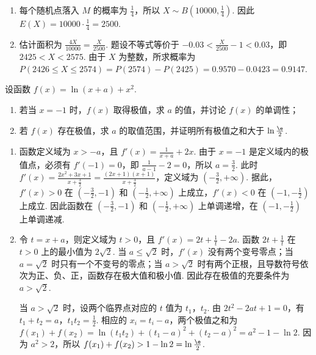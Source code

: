 \begin{solution}
\begin{enumerate}
\item 每个随机点落入 \(M\) 的概率为 \(\frac{1}{4}\)，所以 \(X\sim B\left(10000,\frac{1}{4}\right)\). 因此
\(E(X)=10000\cdot\frac{1}{4}=2500\).
\item 估计面积为 \(\frac{4X}{10000}=\frac{X}{2500}\). 题设不等式等价于
\(-0.03<\frac{X}{2500}-1<0.03\)，即 \(2425<X<2575\). 由于 \(X\) 为整数，所求概率为
\(P(2426\leqslant X\leqslant2574)=P(2574)-P(2425)=0.9570-0.0423=0.9147\).
\end{enumerate}
\end{solution}

\begin{problem}
设函数 \( f(x) = \ln (x + a) + x^2 \).

\begin{enumerate}
\item 若当 \(x = -1\) 时，\(f(x)\) 取得极值，求 \(a\) 的值，并讨论 \(f(x)\) 的单调性；
\item 若 \(f(x)\) 存在极值，求 \(a\) 的取值范围，并证明所有极值之和大于 \( \ln \frac{\e}{2} \).
\end{enumerate}
\end{problem}

\begin{solution}
\begin{enumerate}
\item 函数定义域为 \(x>-a\)，且 \(f'(x)=\frac{1}{x+a}+2x\). 由于 \(x=-1\) 是定义域内的极值点，必须有 \(f'(-1)=0\)，即 \(\frac{1}{a-1}-2=0\)，所以 \(a=\frac{3}{2}\). 此时
\(f'(x)=\frac{2x^2+3x+1}{x+\frac{3}{2}}=\frac{(2x+1)(x+1)}{x+\frac{3}{2}}\)，定义域为 \(\left(-\frac{3}{2},+\infty\right)\). 据此，\(f'(x)>0\) 在 \(\left(-\frac{3}{2},-1\right)\) 和 \(\left(-\frac{1}{2},+\infty\right)\) 上成立，\(f'(x)<0\) 在 \(\left(-1,-\frac{1}{2}\right)\) 上成立. 因此函数在 \(\left(-\frac{3}{2},-1\right)\) 和 \(\left(-\frac{1}{2},+\infty\right)\) 上单调递增，在 \(\left(-1,-\frac{1}{2}\right)\) 上单调递减.
\item 令 \(t=x+a\)，则定义域为 \(t>0\)，且
\(f'(x)=2t+\frac{1}{t}-2a\). 函数 \(2t+\frac{1}{t}\) 在 \(t>0\) 上的最小值为 \(2\sqrt{2}\). 当 \(a\leqslant\sqrt{2}\) 时，\(f'(x)\) 没有两个变号零点；当 \(a=\sqrt{2}\) 时只有一个不变号的零点；当 \(a>\sqrt{2}\) 时有两个正根，且导数符号依次为正、负、正，函数存在极大值和极小值. 因此存在极值的充要条件为 \(a>\sqrt{2}\).

当 \(a>\sqrt{2}\) 时，设两个临界点对应的 \(t\) 值为 \(t_1\)，\(t_2\). 由 \(2t^2-2at+1=0\)，有 \(t_1+t_2=a\)，\(t_1t_2=\frac{1}{2}\). 相应的 \(x_i=t_i-a\)，两个极值之和为
\(f(x_1)+f(x_2)=\ln(t_1t_2)+(t_1-a)^2+(t_2-a)^2=a^2-1-\ln2\). 因为 \(a^2>2\)，所以
\(f(x_1)+f(x_2)>1-\ln2=\ln\frac{\e}{2}\).
\end{enumerate}
\end{solution}

